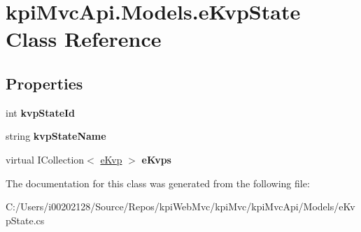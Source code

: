 \hypertarget{classkpi_mvc_api_1_1_models_1_1e_kvp_state}{}\section{kpi\+Mvc\+Api.\+Models.\+e\+Kvp\+State Class Reference}
\label{classkpi_mvc_api_1_1_models_1_1e_kvp_state}
\subsection*{Properties}
\begin{DoxyCompactItemize}
\item 
\mbox{\label{classkpi_mvc_api_1_1_models_1_1e_kvp_state_a208a1e40cce3ccc887a7efe320248bd0}} 
int {\bfseries kvp\+State\+Id}
\item 
\mbox{\label{classkpi_mvc_api_1_1_models_1_1e_kvp_state_ab8cf8536058fd8ab48af0639801e44c3}} 
string {\bfseries kvp\+State\+Name}
\item 
\mbox{\label{classkpi_mvc_api_1_1_models_1_1e_kvp_state_a2aa7da351a2090192ca68d6eaa968706}} 
virtual I\+Collection$<$ \hyperlink{classkpi_mvc_api_1_1_models_1_1e_kvp}{e\+Kvp} $>$ {\bfseries e\+Kvps}
\end{DoxyCompactItemize}


The documentation for this class was generated from the following file\+:\begin{DoxyCompactItemize}
\item 
C\+:/\+Users/i00202128/\+Source/\+Repos/kpi\+Web\+Mvc/kpi\+Mvc/kpi\+Mvc\+Api/\+Models/e\+Kvp\+State.\+cs\end{DoxyCompactItemize}
